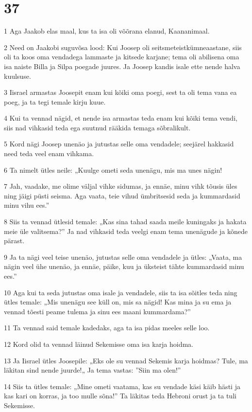\chapter{37}

\par 1 Aga Jaakob elas maal, kus ta isa oli võõrana elanud, Kaananimaal.
\par 2 Need on Jaakobi suguvõsa lood: Kui Joosep oli seitsmeteistkümneaastane, siis oli ta koos oma vendadega lammaste ja kitsede karjane; tema oli abilisena oma isa naiste Billa ja Silpa poegade juures. Ja Joosep kandis isale ette nende halva kuulsuse.
\par 3 Iisrael armastas Joosepit enam kui kõiki oma poegi, sest ta oli tema vana ea poeg, ja ta tegi temale kirju kuue.
\par 4 Kui ta vennad nägid, et nende isa armastas teda enam kui kõiki tema vendi, siis nad vihkasid teda ega suutnud rääkida temaga sõbralikult.
\par 5 Kord nägi Joosep unenäo ja jutustas selle oma vendadele; seejärel hakkasid need teda veel enam vihkama.
\par 6 Ta nimelt ütles neile: „Kuulge ometi seda unenägu, mis ma unes nägin!
\par 7 Jah, vaadake, me olime väljal vihke sidumas, ja ennäe, minu vihk tõusis üles ning jäigi püsti seisma. Aga vaata, teie vihud ümbritsesid seda ja kummardasid minu vihu ees.”
\par 8 Siis ta vennad ütlesid temale: „Kas sina tahad saada meile kuningaks ja hakata meie üle valitsema?” Ja nad vihkasid teda veelgi enam tema unenägude ja kõnede pärast.
\par 9 Ja ta nägi veel teise unenäo, jutustas selle oma vendadele ja ütles: „Vaata, ma nägin veel ühe unenäo, ja ennäe, päike, kuu ja üksteist tähte kummardasid minu ees.”
\par 10 Aga kui ta seda jutustas oma isale ja vendadele, siis ta isa sõitles teda ning ütles temale: „Mis unenägu see küll on, mis sa nägid! Kas mina ja su ema ja vennad tõesti peame tulema ja sinu ees maani kummardama?”
\par 11 Ta vennad said temale kadedaks, aga ta isa pidas meeles selle loo.
\par 12 Kord olid ta vennad läinud Sekemisse oma isa karja hoidma.
\par 13 Ja Iisrael ütles Joosepile: „Eks ole su vennad Sekemis karja hoidmas? Tule, ma läkitan sind nende juurde!„ Ja tema vastas: ”Siin ma olen!”
\par 14 Siis ta ütles temale: „Mine ometi vaatama, kas su vendade käsi käib hästi ja kas kari on korras, ja too mulle sõna!” Ta läkitas teda Hebroni orust ja ta tuli Sekemisse.
